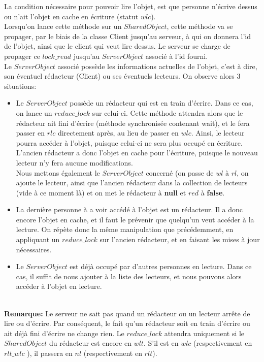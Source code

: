 \documentclass[11pt,a4paper]{report}
\begin{document}
La condition nécessaire pour pouvoir lire l'objet, est que personne n'écrive dessus ou n'ait l'objet en cache en écriture (statut $wlc$). \\
Lorsqu'on lance cette méthode sur un $SharedObject$, cette méthode va se propager, par le biais de la classe Client jusqu'au serveur, à qui on donnera l'id de l'objet, ainsi que le client qui veut lire dessus. Le serveur se charge de propager ce $lock\_read$ jusqu'au $ServerObject$ associé à l'id fourni. \\
Le $ServerObject$ associé possède les informations actuelles de l'objet, c'est à dire, son éventuel rédacteur (Client) ou ses éventuels lecteurs. On observe alors 3 situations: 
\begin{itemize}
\item Le $ServerObject$ possède un rédacteur qui est en train d'écrire. Dans ce cas, on lance un $reduce\_lock$ sur celui-ci. Cette méthode attendra alors que le rédacteur ait fini d'écrire (méthode synchronisée contenant wait), et le fera passer en $rlc$ directement après, au lieu de passer en $wlc$. Ainsi, le lecteur pourra accéder à l'objet, puisque celui-ci ne sera plus occupé en écriture. L'ancien rédacteur a donc l'objet en cache pour l'écriture, puisque le nouveau lecteur n'y fera aucune modifications. \\
Nous mettons également le $ServerObject$ concerné (on passe de $wl$ à $rl$, on ajoute le lecteur, ainsi que l'ancien rédacteur dans la collection de lecteurs (vide à ce moment là) et on met le rédacteur à {\bf null} et $red$ à \textbf{false}.
\item La dernière personne à a voir accédé à l'objet est un rédacteur. Il a donc encore l'objet en cache, et il faut le prévenir que quelqu'un veut accéder à la lecture. On répète donc la même manipulation que précédemment, en appliquant un $reduce\_lock$ sur l'ancien rédacteur, et en faisant les mises à jour nécessaires. 
\item Le $ServerObject$ est déjà occupé par d'autres personnes en lecture. Dans ce cas, il suffit de nous ajouter à la liste des lecteurs, et nous pouvons alors accéder à l'objet en lecture.\\\\
\end{itemize}

\textbf{Remarque:} Le serveur ne sait pas quand un rédacteur ou un lecteur arrête de lire ou d'écrire. Par conséquent, le fait qu'un rédacteur soit en train d'écrire ou ait déjà fini d'écrire ne change rien. Le $reduce\_lock$ attendra uniquement si le $SharedObject$ du rédacteur est encore en $wlt$. S'il est en $wlc$ (respectivement en $rlt\_wlc$ ), il passera en $nl$ (respectivement en $rlt$).\\\\
\end{document}
